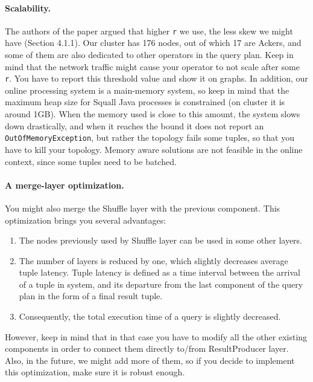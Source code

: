 \documentclass[a4paper,10pt]{article}
\begin{document}
\paragraph{Scalability.} The authors of the paper argued that higher \verb#r# we use, the less skew we might have (Section 4.1.1). Our cluster has 176 nodes, out of which 17 are Ackers, and some of them are also dedicated to other operators in the query plan. Keep in mind that the network traffic might cause your operator to not scale after some \verb#r#. You have to report this threshold value and show it on graphs. In addition, our online processing system is a main-memory system, so keep in mind that the maximum heap size for Squall Java processes is constrained (on cluster it is around 1GB). When the memory used is close to this amount, the system slows down drastically, and when it reaches the bound it does not report an \verb|OutOfMemoryException|, but rather the topology fails some tuples, so that you have to kill your topology. Memory aware solutions are not feasible in the online context, since some tuples need to be batched. 

\paragraph{A merge-layer optimization.} You might also merge the Shuffle layer with the previous component. This optimization brings you several advantages:
\begin{enumerate}
 \item The nodes previously used by Shuffle layer can be used in some other layers.
 \item The number of layers is reduced by one, which slightly decreases average tuple latency. Tuple latency is defined as a time interval between the arrival of a tuple in system, and its departure from the last component of the query plan in the form of a final result tuple.
 \item Consequently, the total execution time of a query is slightly decreased.
\end{enumerate}

However, keep in mind that in that case you have to modify all the other existing components in order to connect them directly to/from ResultProducer layer. Also, in the future, we might add more of them, so if you decide to implement this optimization, make sure it is robust enough.

\end{document}
